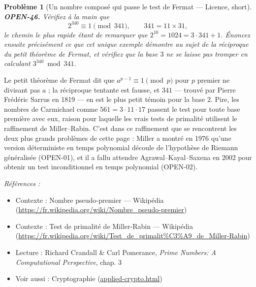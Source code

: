 \documentclass[11pt]{article}
\newtheorem{problem}{Problème}
\newenvironment{refs}{\par\small\noindent\emph{Références :}\begin{itemize}\setlength\itemsep{0pt}}{\end{itemize}\normalsize}
\begin{document}
\bigskip

\begin{problem}[{Un nombre composé qui passe le test de Fermat --- Licence, short}]
\textbf{OPEN-46.} Vérifiez à la main que
\[ 2^{340} \equiv 1 \pmod{341}, \qquad 341 = 11 \times 31 , \]
le chemin le plus rapide étant de remarquer que $ 2^{10} = 1024 = 3 \cdot 341 + 1 $.
Énoncez ensuite précisément ce que cet unique exemple démontre au sujet de la réciproque
du petit théorème de Fermat, et vérifiez que la base $ 3 $ ne se laisse pas tromper en
calculant $ 3^{340} \bmod 341 $.
\end{problem}

\noindent Le petit théorème de Fermat dit que $ a^{p-1} \equiv 1 \pmod p $ pour
$ p $ premier ne divisant pas $ a $ ; la réciproque tentante est fausse, et $ 341 $
--- trouvé par Pierre Frédéric Sarrus en 1819 --- en est le plus petit témoin pour la base
$ 2 $. Pire, les nombres de Carmichael comme $ 561 = 3 \cdot 11 \cdot 17 $ passent le
test pour toute base première avec eux, raison pour laquelle les vrais tests de primalité
utilisent le raffinement de Miller--Rabin. C'est dans ce raffinement que se rencontrent les
deux plus grands problèmes de cette page : Miller a montré en 1976 qu'une version
déterministe en temps polynomial découle de l'hypothèse de Riemann généralisée (OPEN-01),
et il a fallu attendre Agrawal--Kayal--Saxena en 2002 pour obtenir un test inconditionnel en
temps polynomial (OPEN-02).

\begin{refs}
\item Contexte : Nombre pseudo-premier --- Wikipédia (\url{https://fr.wikipedia.org/wiki/Nombre_pseudo-premier})
\item Contexte : Test de primalité de Miller-Rabin --- Wikipédia (\url{https://fr.wikipedia.org/wiki/Test_de_primalit%C3%A9_de_Miller-Rabin})
\item Lecture : Richard Crandall \& Carl Pomerance, \textit{Prime Numbers: A Computational Perspective}, chap. 3
\item Voir aussi : Cryptographie (\url{applied-crypto.html})
\end{refs}

\bigskip
\end{document}
